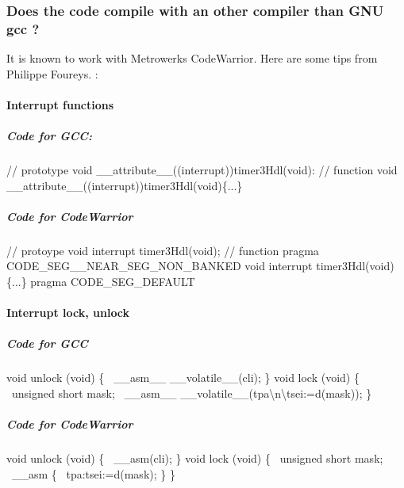 \documentclass[12pt,twoside]{article}
\begin{document}
\subsubsection{Does the code compile with an other compiler than GNU gcc
?}
It is known to work with Metrowerks CodeWarrior. Here are some tips from
Philippe Foureys. :

\paragraph{Interrupt functions}
\subparagraph{Code for GCC:}
{\ttfamily
 // prototype\newline
 void \_\_attribute\_\_((interrupt))timer3Hdl(void):\newline
 // function\newline
 void \_\_attribute\_\_((interrupt))timer3Hdl(void)\{...\}}

\subparagraph{Code for CodeWarrior}
{\ttfamily
 // protoype\newline
 void interrupt timer3Hdl(void);\newline
 // function\newline
 pragma CODE\_SEG\_\_NEAR\_SEG\_NON\_BANKED\newline
 void interrupt timer3Hdl(void)\newline
 \{...\}\newline
 pragma CODE\_SEG\_DEFAULT}

\paragraph{Interrupt lock, unlock}
\subparagraph{Code for GCC}
{\ttfamily
 void unlock (void)\newline
 \{\newline
  \ \_\_asm\_\_
\_\_volatile\_\_({\textquotedbl}cli{\textquotedbl});\newline
 \}\newline
 void lock (void)\newline
 \{\newline
  \ unsigned short mask;\newline
  \ \_\_asm\_\_
\_\_volatile\_\_({\textquotedbl}tpa{\textbackslash}n{\textbackslash}tsei{\textquotedbl}:{\textquotedbl}=d{\textquotedbl}(mask));\newline
 \}}

\subparagraph{Code for CodeWarrior}
{\ttfamily
void unlock (void)\newline
 \{\newline
  \ \_\_asm({\textquotedbl}cli{\textquotedbl});\newline
 \}\newline
 void lock (void)\newline
 \{\newline
  \ unsigned short mask;\newline
  \ \_\_asm\newline
  \{\newline
  \ tpa:tsei:{\textquotedbl}=d{\textquotedbl}(mask);\newline
  \}\newline
 \}}
\end{document}
